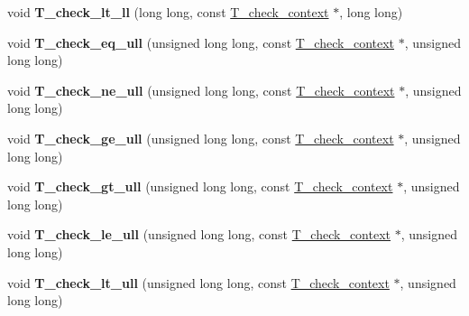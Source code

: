 \begin{DoxyCompactItemize}
void {\bfseries T\+\_\+check\+\_\+lt\+\_\+ll} (long long, const \mbox{\hyperlink{structT__check__context}{T\+\_\+check\+\_\+context}} $\ast$, long long)
\item 
\mbox{\label{group__RTEMSTestFrameworkImpl_ga8207c55da3fb16cb84e2ee66baa3bdc6}} 
void {\bfseries T\+\_\+check\+\_\+eq\+\_\+ull} (unsigned long long, const \mbox{\hyperlink{structT__check__context}{T\+\_\+check\+\_\+context}} $\ast$, unsigned long long)
\item 
\mbox{\label{group__RTEMSTestFrameworkImpl_ga6bb031af67b63247fc2d5a1cf287b3ee}} 
void {\bfseries T\+\_\+check\+\_\+ne\+\_\+ull} (unsigned long long, const \mbox{\hyperlink{structT__check__context}{T\+\_\+check\+\_\+context}} $\ast$, unsigned long long)
\item 
\mbox{\label{group__RTEMSTestFrameworkImpl_ga0a42cfbd2fbc8d3aca39ccc67d9962e1}} 
void {\bfseries T\+\_\+check\+\_\+ge\+\_\+ull} (unsigned long long, const \mbox{\hyperlink{structT__check__context}{T\+\_\+check\+\_\+context}} $\ast$, unsigned long long)
\item 
\mbox{\label{group__RTEMSTestFrameworkImpl_ga1499a9fd10433e9ab8941ef85a9305f5}} 
void {\bfseries T\+\_\+check\+\_\+gt\+\_\+ull} (unsigned long long, const \mbox{\hyperlink{structT__check__context}{T\+\_\+check\+\_\+context}} $\ast$, unsigned long long)
\item 
\mbox{\label{group__RTEMSTestFrameworkImpl_gabdedf981f625a0c92f2b405447349443}} 
void {\bfseries T\+\_\+check\+\_\+le\+\_\+ull} (unsigned long long, const \mbox{\hyperlink{structT__check__context}{T\+\_\+check\+\_\+context}} $\ast$, unsigned long long)
\item 
\mbox{\label{group__RTEMSTestFrameworkImpl_ga5af6bd65e277dfd91a222f5cb88d1519}} 
void {\bfseries T\+\_\+check\+\_\+lt\+\_\+ull} (unsigned long long, const \mbox{\hyperlink{structT__check__context}{T\+\_\+check\+\_\+context}} $\ast$, unsigned long long)
\item 
\mbox{\label{group__RTEMSTestFrameworkImpl_ga7e7b2be2a21891c39c8bd4a6015aa229}} 

\end{DoxyCompactItemize}
